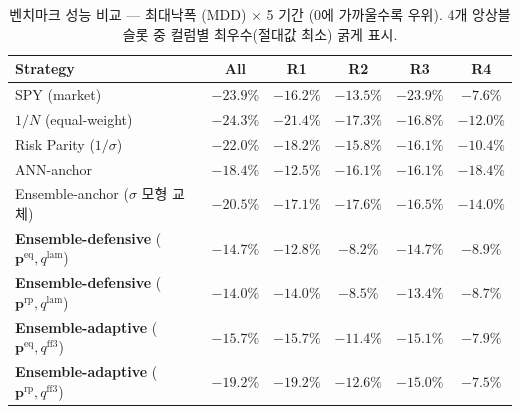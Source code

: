 \documentclass[eng]{kjas3}
\begin{document}
\begin{table}[t]
\centering
\caption{벤치마크 성능 비교 — 최대낙폭 (MDD) $\times$ 5 기간 (0에 가까울수록 우위).
4개 앙상블 슬롯 중 컬럼별 최우수(절대값 최소) 굵게 표시.}
\label{tab:benchmark_mdd}
\setlength{\tabcolsep}{6pt}
\renewcommand{\arraystretch}{1.15}
\small
\begin{tabular}{lccccc}
\toprule
Strategy & All & R1 & R2 & R3 & R4 \\
\midrule
SPY (market)                       & $-23.9\%$ & $-16.2\%$ & $-13.5\%$ & $-23.9\%$ & $-7.6\%$  \\
$1/N$ (equal-weight)               & $-24.3\%$ & $-21.4\%$ & $-17.3\%$ & $-16.8\%$ & $-12.0\%$ \\
Risk Parity ($1/\sigma$)           & $-22.0\%$ & $-18.2\%$ & $-15.8\%$ & $-16.1\%$ & $-10.4\%$ \\
ANN-anchor \citep{pyo2018}         & $-18.4\%$ & $-12.5\%$ & $-16.1\%$ & $-16.1\%$ & $-18.4\%$ \\
Ensemble-anchor ($\sigma$ 모형 교체) & $-20.5\%$ & $-17.1\%$ & $-17.6\%$ & $-16.5\%$ & $-14.0\%$ \\
\midrule
\textbf{Ensemble-defensive} ($\mathbf{p}^{\mathrm{eq}}, q^{\mathrm{lam}}$) & $-14.7\%$          & $\mathbf{-12.8\%}$ & $\mathbf{-8.2\%}$ & $-14.7\%$          & $-8.9\%$ \\
\textbf{Ensemble-defensive} ($\mathbf{p}^{\mathrm{rp}}, q^{\mathrm{lam}}$) & $\mathbf{-14.0\%}$ & $-14.0\%$          & $-8.5\%$          & $\mathbf{-13.4\%}$ & $-8.7\%$ \\
\textbf{Ensemble-adaptive}  ($\mathbf{p}^{\mathrm{eq}}, q^{\mathrm{ff3}}$) & $-15.7\%$          & $-15.7\%$          & $-11.4\%$         & $-15.1\%$          & $-7.9\%$ \\
\textbf{Ensemble-adaptive}  ($\mathbf{p}^{\mathrm{rp}}, q^{\mathrm{ff3}}$) & $-19.2\%$          & $-19.2\%$          & $-12.6\%$         & $-15.0\%$          & $\mathbf{-7.5\%}$ \\
\bottomrule
\end{tabular}
\end{table}
\end{document}
